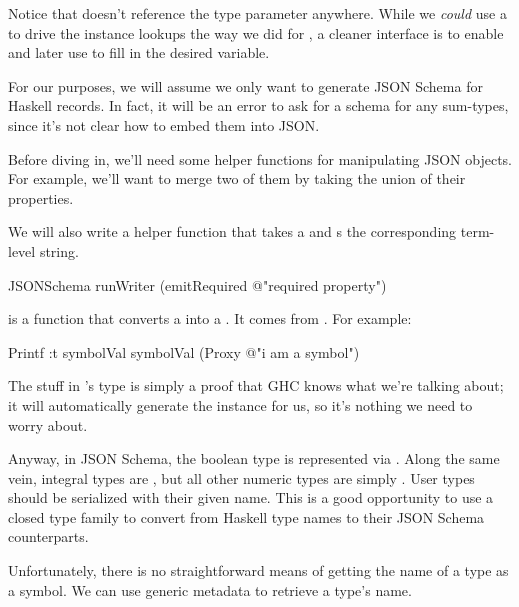 \documentclass[book.tex]{subfiles}
\begin{document}

Notice that  doesn't reference the  type parameter anywhere.
While we \emph{could} use a  to drive the instance lookups the way we
did for , a cleaner interface is to enable
 and later use  to fill in the
desired variable.

For our purposes, we will assume we only want to generate JSON Schema for
Haskell records. In fact, it will be an error to ask for a schema for any
sum-types, since it's not clear how to embed them into JSON.

Before diving in, we'll need some helper functions for manipulating JSON
objects. For example, we'll want to merge two of them by taking the union of
their properties.


We will also write a helper function that takes a  and
s the corresponding term-level string.


\begin{dorepl}{JSONSchema}
runWriter (emitRequired @"required property")
\end{dorepl}

 is a function that converts a  into a .
It comes from . For example:

\begin{dorepl}{Printf}
:t symbolVal
symbolVal (Proxy @"i am a symbol")
\end{dorepl}

The  stuff in 's type is simply a proof that GHC
knows what  we're talking about; it will automatically generate the
 instance for us, so it's nothing we need to worry about.

Anyway, in JSON Schema, the boolean type  is represented via
.  Along the same vein, integral types are , but
all other numeric types are simply . User types should be
serialized with their given name. This is a good opportunity to use a closed
type family to convert from Haskell type names to their JSON Schema
counterparts.


Unfortunately, there is no straightforward means of getting the name of a type
as a symbol. We can use generic metadata to retrieve a type's name.
\end{document}
